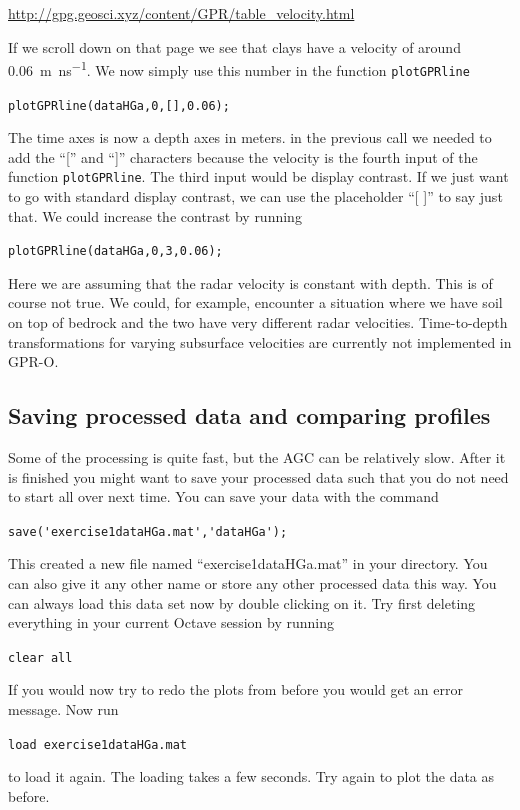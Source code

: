 \documentclass[11pt]{article}
\begin{document}
\url{http://gpg.geosci.xyz/content/GPR/table_velocity.html}
  
If we scroll down on that page we see that clays have a velocity of
around \SI{0.06}{m\per\nano\second}. We now simply use this number in the function
\verb#plotGPRline#
  
\qquad \verb#plotGPRline(dataHGa,0,[],0.06);#
  
The time axes is now a depth axes in meters. in the previous call we
needed to add the ``['' and ``]'' characters because the velocity is
the fourth input of the function \verb#plotGPRline#. The third input
would be display contrast. If we just want to go with standard display
contrast, we can use the placeholder ``[ ]'' to say just that. We
could increase the contrast by running
  
\qquad \verb#plotGPRline(dataHGa,0,3,0.06);#

Here we are assuming that the radar velocity is constant with
depth. This is of course not true. We could, for example, encounter a
situation where we have soil on top of bedrock and the two have very
different radar velocities. Time-to-depth transformations for varying
subsurface velocities are currently not implemented in GPR-O.

\subsection{Saving processed data and comparing profiles}

Some of the processing is quite fast, but the AGC can be relatively
slow. After it is finished you might want to
save your processed data such that you do not need to start all over
next time. You can save your data with the command
 
\qquad \verb#save('exercise1dataHGa.mat','dataHGa');#
 
This created a new file named ``exercise1dataHGa.mat'' in your
directory. You can also give it any other name or store any other
processed data this way. You can always load this data set now by
double clicking on it. Try first deleting everything in your current
Octave session by running
 
\qquad \verb#clear all#
 
If you would now try to redo the plots from before you would get an
error message. Now run
 
\qquad \verb#load exercise1dataHGa.mat#
 
to load it again.  The loading takes a few seconds. Try again to plot
the data as before.
\end{document}
